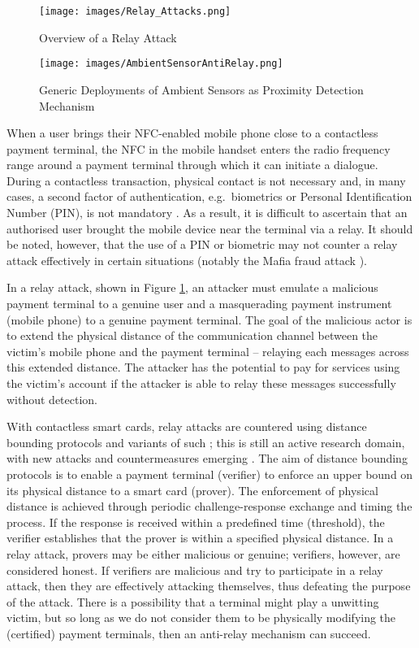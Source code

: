 \documentclass{article}
\begin{document}
\begin{figure}[ht]
	\centering
		\texttt{[image: images/Relay\_Attacks.png]}
	\caption{Overview of a Relay Attack}
	\label{fig:relay_attack}
\end{figure}

\begin{figure*}[ht]
	\centering
		\texttt{[image: images/AmbientSensorAntiRelay.png]}
	\caption{Generic Deployments of Ambient Sensors as Proximity Detection Mechanism}
	\label{fig:AmbientSensorDeploymentOverview}
\end{figure*}

When a user brings their NFC-enabled mobile phone close to a contactless payment terminal, the NFC in the mobile handset enters the radio frequency range around a payment terminal through which it can initiate a dialogue.  During a contactless transaction, physical contact is not necessary and, in many cases, a second factor of authentication, e.g.\ biometrics or Personal Identification Number (PIN), is not mandatory \cite{EVM2015-ContactlessArchitectureReq}.  As a result, it is difficult to ascertain that an authorised user brought the mobile device near the terminal via a relay.  It should be noted, however, that the use of a PIN or biometric may not counter a relay attack effectively in certain situations (notably the Mafia fraud attack \cite{Cremers2012}).

In a relay attack, shown in Figure \ref{fig:relay_attack}, an attacker must emulate a malicious payment terminal to a genuine user and a masquerading payment instrument (mobile phone) to a genuine payment terminal.  The goal of the malicious actor is to extend the physical distance of the communication channel between the victim's mobile phone and the payment terminal -- relaying each messages across this extended distance.  The attacker has the potential to pay for services using the victim's account if the attacker is able to relay these messages successfully without detection.

With contactless smart cards, relay attacks are countered using distance bounding protocols \cite{rasmussen2010realization} and variants of such \cite{Hancke2009615}; this is still an active research domain, with new attacks and countermeasures emerging \cite{Hancke:2008:ATD:1352533.1352566, Cremers2012, boureanu2014towards}.  The aim of distance bounding protocols is to enable a payment terminal (verifier) to enforce an upper bound on its physical distance to a smart card (prover).  The enforcement of physical distance is achieved through periodic challenge-response exchange and timing the process.  If the response is received within a predefined time (threshold), the verifier establishes that the prover is within a specified physical distance.  In a relay attack, provers may be either malicious or genuine; verifiers, however, are considered honest.  If verifiers are malicious and try to participate in a relay attack, then they are effectively attacking themselves, thus defeating the purpose of the attack. There is a possibility that a terminal might play a unwitting victim, but so long as we do not consider them to be physically modifying the (certified) payment terminals, then an anti-relay mechanism can succeed.
\end{document}
